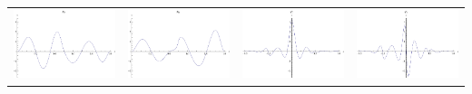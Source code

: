 \documentclass{article}
\begin{document}
\begin{landscape}
\begin{tabular}{cccc}
\includegraphics[width=5.0cm]{septic_bspline_5.pdf}& \includegraphics[width=5.0cm]{septic_bspline_6.pdf}& \includegraphics[width=5.0cm]{septic_bspline_7.pdf}& \includegraphics[width=5.0cm]{septic_bspline_8.pdf} \\
\end{tabular} 
 \end{landscape}
\end{document}
